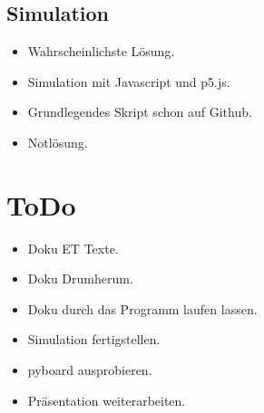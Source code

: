 \documentclass{article}
\begin{document}
\subsection{Simulation}

\begin{itemize}

\item Wahrscheinlichste Lösung.

\item Simulation mit Javascript und p5.js.

\item Grundlegendes Skript schon auf Github.

\item Notlösung.

\end{itemize}

\section{ToDo}

\begin{itemize}

\item Doku ET Texte.

\item Doku Drumherum.

\item Doku durch das Programm laufen lassen.

\item Simulation fertigstellen.

\item pyboard ausprobieren.

\item Präsentation weiterarbeiten.

\end{itemize}
\end{document}
